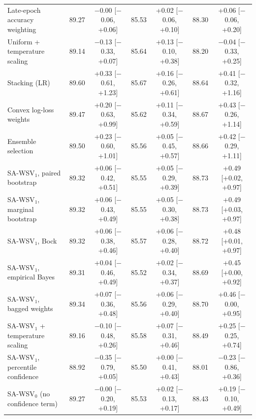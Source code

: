 \begin{table}[!htbp]
\begin{tabular}{lcccccc}
Late-epoch accuracy weighting & 89.27 & $-$0.00 [$-$0.06, +0.06] & 85.53 & +0.02 [$-$0.06, +0.10] & 88.30 & +0.06 [$-$0.06, +0.20] \\
Uniform + temperature scaling & 89.14 & $-$0.13 [$-$0.33, +0.07] & 85.64 & +0.13 [$-$0.10, +0.38] & 88.20 & $-$0.04 [$-$0.33, +0.25] \\
Stacking (LR) & 89.60 & +0.33 [$-$0.61, +1.23] & 85.67 & +0.16 [$-$0.26, +0.61] & 88.64 & +0.41 [$-$0.32, +1.16] \\
Convex log-loss weights & 89.47 & +0.20 [$-$0.63, +0.99] & 85.62 & +0.11 [$-$0.34, +0.59] & 88.67 & +0.43 [$-$0.26, +1.14] \\
Ensemble selection & 89.50 & +0.23 [$-$0.60, +1.01] & 85.56 & +0.05 [$-$0.45, +0.57] & 88.66 & +0.42 [$-$0.29, +1.11] \\
SA-WSV$_1$, paired bootstrap & 89.32 & +0.06 [$-$0.42, +0.51] & 85.55 & +0.05 [$-$0.29, +0.39] & 88.73 & +0.49 [+0.02, +0.97] \\
SA-WSV$_1$, marginal bootstrap & 89.32 & +0.06 [$-$0.43, +0.49] & 85.55 & +0.05 [$-$0.30, +0.38] & 88.73 & +0.49 [+0.03, +0.97] \\
SA-WSV$_1$, Bock & 89.32 & +0.06 [$-$0.38, +0.46] & 85.57 & +0.06 [$-$0.28, +0.40] & 88.72 & +0.48 [+0.01, +0.97] \\
SA-WSV$_1$, empirical Bayes & 89.31 & +0.04 [$-$0.46, +0.49] & 85.52 & +0.02 [$-$0.34, +0.37] & 88.69 & +0.45 [+0.00, +0.92] \\
SA-WSV$_1$, bagged weights & 89.34 & +0.07 [$-$0.36, +0.48] & 85.56 & +0.06 [$-$0.29, +0.40] & 88.70 & +0.46 [$-$0.00, +0.95] \\
SA-WSV$_1$ + temperature scaling & 89.16 & $-$0.10 [$-$0.48, +0.26] & 85.58 & +0.07 [$-$0.31, +0.46] & 88.49 & +0.25 [$-$0.25, +0.74] \\
SA-WSV$_1$, percentile confidence & 88.92 & $-$0.35 [$-$0.79, +0.05] & 85.50 & +0.00 [$-$0.41, +0.43] & 88.01 & $-$0.23 [$-$0.86, +0.36] \\
SA-WSV$_0$ (no confidence term) & 89.27 & $-$0.00 [$-$0.20, +0.19] & 85.53 & +0.02 [$-$0.13, +0.17] & 88.43 & +0.19 [$-$0.10, +0.49] \\
\bottomrule\end{tabular}\end{table}


